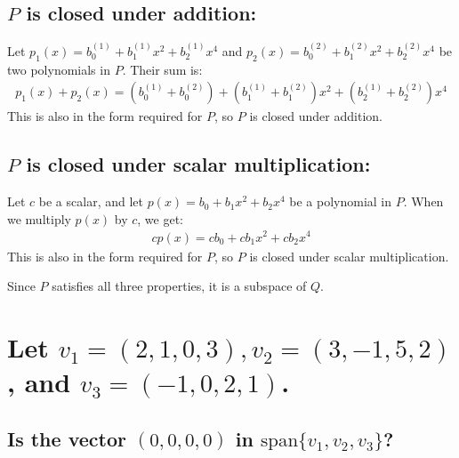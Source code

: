 \documentclass[
  letterpaper,
  DIV=11,
  numbers=noendperiod]{scrartcl}
\begin{document}
\subsection{\texorpdfstring{\(P\) is closed under
addition:}{P is closed under addition:}}\label{p-is-closed-under-addition}

Let \(p_1(x) = b_0^{(1)} + b_1^{(1)}x^2 + b_2^{(1)}x^4\) and
\(p_2(x) = b_0^{(2)} + b_1^{(2)}x^2 + b_2^{(2)}x^4\) be two polynomials
in \(P\). Their sum is: \begin{align*}
p_1(x) + p_2(x) = (b_0^{(1)} + b_0^{(2)}) + (b_1^{(1)} + b_1^{(2)})x^2 + (b_2^{(1)} + b_2^{(2)})x^4
\end{align*} This is also in the form required for \(P\), so \(P\) is
closed under addition.

\subsection{\texorpdfstring{\(P\) is closed under scalar
multiplication:}{P is closed under scalar multiplication:}}\label{p-is-closed-under-scalar-multiplication}

Let \(c\) be a scalar, and let \(p(x) = b_0 + b_1x^2 + b_2x^4\) be a
polynomial in \(P\). When we multiply \(p(x)\) by \(c\), we get:
\begin{align*}
cp(x) = cb_0 + cb_1x^2 + cb_2x^4
\end{align*} This is also in the form required for \(P\), so \(P\) is
closed under scalar multiplication.

Since \(P\) satisfies all three properties, it is a subspace of \(Q\).

\newpage{}

\section{\texorpdfstring{Let
\(v_1 = (2, 1, 0, 3), v_2 = (3, -1, 5, 2)\), and
\(v_3 = (-1, 0, 2, 1)\).}{Let v\_1 = (2, 1, 0, 3), v\_2 = (3, -1, 5, 2), and v\_3 = (-1, 0, 2, 1).}}\label{let-v_1-2-1-0-3-v_2-3--1-5-2-and-v_3--1-0-2-1.}

\subsection{\texorpdfstring{Is the vector \((0, 0, 0, 0)\) in
\(\mathrm{span}\{v_1,v_2,v_3\}\)?}{Is the vector (0, 0, 0, 0) in \textbackslash mathrm\{span\}\textbackslash\{v\_1,v\_2,v\_3\textbackslash\}?}}\label{is-the-vector-0-0-0-0-in-mathrmspanv_1v_2v_3}
\end{document}
